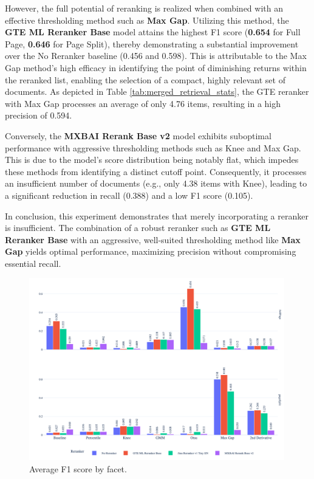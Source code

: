 However, the full potential of reranking is realized when combined with an effective thresholding method such as \textbf{Max Gap}. Utilizing this method, the \textbf{GTE ML Reranker Base} model attains the highest F1 score (\textbf{0.654} for Full Page, \textbf{0.646} for Page Split), thereby demonstrating a substantial improvement over the No Reranker baseline (0.456 and 0.598). This is attributable to the Max Gap method's high efficacy in identifying the point of diminishing returns within the reranked list, enabling the selection of a compact, highly relevant set of documents. As depicted in Table \ref{tab:merged_retrieval_stats}, the GTE reranker with Max Gap processes an average of only 4.76 items, resulting in a high precision of 0.594.

Conversely, the \textbf{MXBAI Rerank Base v2} model exhibits suboptimal performance with aggressive thresholding methods such as Knee and Max Gap. This is due to the model's score distribution being notably flat, which impedes these methods from identifying a distinct cutoff point. Consequently, it processes an insufficient number of documents (e.g., only 4.38 items with Knee), leading to a significant reduction in recall (0.388) and a low F1 score (0.105).

In conclusion, this experiment demonstrates that merely incorporating a reranker is insufficient. The combination of a robust reranker such as \textbf{GTE ML Reranker Base} with an aggressive, well-suited thresholding method like \textbf{Max Gap} yields optimal performance, maximizing precision without compromising essential recall.



\begin{figure}[htbp]
  \centering
  \includegraphics[width=0.99\textwidth]{reranker/avg_f1_score_bar_faceted.png}
  \caption{\footnotesize Average F1 score by facet.}
  \label{fig:avg_f1_score}
\end{figure}

